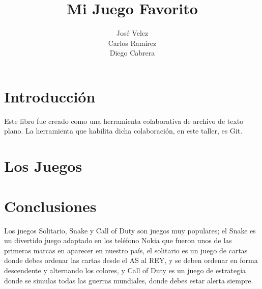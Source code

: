\documentclass[12pt,oneside]{book}
\title{Mi Juego Favorito}
\author{José Velez
\\Carlos Ramirez
\\Diego Cabrera}
\begin{document}
\maketitle
\tableofcontents

\chapter{Introducción}
Este libro fue creado como una herramienta colaborativa de archivo de texto plano. La herramienta que habilita dicha colaboración, en este taller, es Git.

\chapter{Los Juegos}





\chapter{Conclusiones}
Los juegos Solitario, Snake y Call of Duty son juegos muy populares; el Snake es un divertido juego adaptado en los teléfono Nokia que fueron unos de las primeras marcas en aparecer en nuestro país, el solitario es un juego de cartas donde debes ordenar las cartas desde el AS al REY, y se deben ordenar en forma descendente y alternando los colores, y Call of Duty es un juego de estrategia donde se simulas todas las guerras mundiales, donde debes estar alerta siempre.
\end{document}
